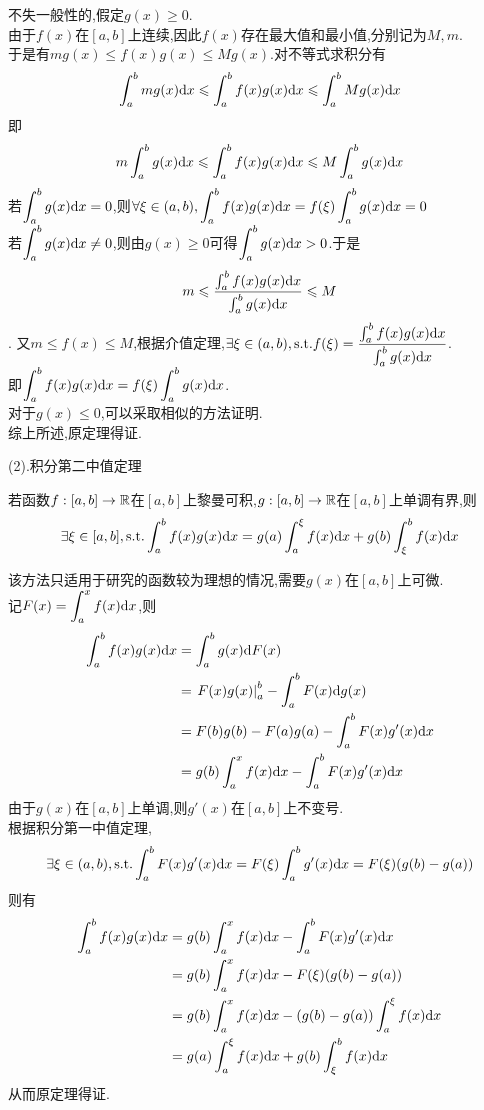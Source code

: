 \documentclass{ctexart}
\begin{document}
\begin{solution}[Proof.]
    不失一般性的,假定$g(x)\geqslant 0$.\\
    由于$f(x)$在$[a,b]$上连续,因此$f(x)$存在最大值和最小值,分别记为$M,m$.\\
    于是有$mg(x)\leqslant f(x)g(x)\leqslant Mg(x)$.对不等式求积分有
    $$\int_{a}^{b}{mg(x)\mathrm{d} x}\leqslant\int_{a}^{b}{f(x)g(x)\mathrm{d} x}\leqslant\int_{a}^{b}{Mg(x)\mathrm{d} x}$$
    即$$m\int_{a}^{b}{g(x)\mathrm{d} x}\leqslant\int_{a}^{b}{f(x)g(x)\mathrm{d} x}\leqslant M\int_{a}^{b}{g(x)\mathrm{d} x}$$
    若$\displaystyle\int_{a}^{b}{g(x)\mathrm{d} x}=0$,则$\displaystyle\forall\xi\in(a,b),\int_{a}^{b}{f(x)g(x)\mathrm{d} x}=f(\xi)\int_{a}^{b}{g(x)\mathrm{d} x}=0$\\
    若$\displaystyle\int_{a}^{b}{g(x)\mathrm{d} x}\neq 0$,则由$g(x)\geqslant 0$可得$\displaystyle\int_{a}^{b}{g(x)\mathrm{d} x}>0$.于是
    $$m\leqslant\dfrac{\int_{a}^{b}{f(x)g(x)\mathrm{d} x}}{\int_{a}^{b}{g(x)\mathrm{d} x}}\leqslant M$$.
    又$m\leqslant f(x)\leqslant M$,根据介值定理,$\exists\xi\in(a,b),\text{s.t.} f(\xi)=\dfrac{\int_{a}^{b}{f(x)g(x)\mathrm{d} x}}{\int_{a}^{b}{g(x)\mathrm{d} x}}$.\\
    即$\displaystyle\int_{a}^{b}{f(x)g(x)\mathrm{d} x}=f(\xi)\int_{a}^{b}{g(x)\mathrm{d} x}$.\\
    对于$g(x)\leqslant 0$,可以采取相似的方法证明.\\
    综上所述,原定理得证.
\end{solution}\noindent
(2).积分第二中值定理
\begin{formal}[积分第二中值定理]
    若函数$f:[a,b]\to\mathbb{R}$在$[a,b]$上黎曼可积,$g:[a,b]\to\mathbb{R}$在$[a,b]$上单调有界,则
    $$\exists\xi\in[a,b],\text{s.t.}\int_{a}^{b}{f(x)g(x)\mathrm{d} x}=g(a)\int_{a}^{\xi}{f(x)\mathrm{d} x}+g(b)\int_{\xi}^{b}{f(x)\mathrm{d} x}$$
\end{formal}
\begin{solution}
    该方法只适用于研究的函数较为理想的情况,需要$g(x)$在$[a,b]$上可微.\\
    记$\displaystyle F(x)=\int_{a}^{x}{f(x)\mathrm{d} x}$,则
    $$\begin{aligned}
        \int_{a}^{b}{f(x)g(x)\mathrm{d} x}
        &= \int_{a}^{b}{g(x)\mathrm{d} F(x)} \\
        &= \left.F(x)g(x)\right|_{a}^{b}-\int_{a}^{b}{F(x)\mathrm{d} g(x)} \\
        &= F(b)g(b)-F(a)g(a)-\int_{a}^{b}{F(x)g'(x)\mathrm{d} x} \\
        &= g(b)\int_{a}^{x}{f(x)\mathrm{d} x}-\int_{a}^{b}{F(x)g'(x)\mathrm{d} x}
    \end{aligned}$$
    由于$g(x)$在$[a,b]$上单调,则$g'(x)$在$[a,b]$上不变号.\\
    根据积分第一中值定理,$$\exists\xi\in(a,b),\text{s.t.}\int_{a}^{b}{F(x)g'(x)\mathrm{d} x}=F(\xi)\int_{a}^{b}{g'(x)\mathrm{d} x}=F(\xi)(g(b)-g(a))$$
    则有$$\begin{aligned}
        \int_{a}^{b}{f(x)g(x)\mathrm{d} x}
        &= g(b)\int_{a}^{x}{f(x)\mathrm{d} x}-\int_{a}^{b}{F(x)g'(x)\mathrm{d} x} \\
        &= g(b)\int_{a}^{x}{f(x)\mathrm{d} x}-F(\xi)(g(b)-g(a)) \\
        &= g(b)\int_{a}^{x}{f(x)\mathrm{d} x}-(g(b)-g(a))\int_{a}^{\xi}{f(x)\mathrm{d} x} \\
        &= g(a)\int_{a}^{\xi}{f(x)\mathrm{d} x}+g(b)\int_{\xi}^{b}{f(x)\mathrm{d} x}
    \end{aligned}$$
    从而原定理得证.
\end{solution}\noindent
\end{document}
